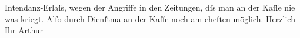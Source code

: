                Intendanz-Erlaſs, wegen der Angriffe in den Zeitungen, dſs man an der Kaſſe nie was
               kriegt. Alſo durch Dienſtma{\geminationn} an der Kaſſe noch am
               eheſten möglich.\pend
           \pstart Herzlich Ihr \spacefill\mbox{Arthur}\pend{}\endnumbering{}  \newcommand{\dateiname}{L01002}\newcommand{\titel}{Arthur Schnitzler an Richard Beer-Hofmann, [27. oder 28]. 11. 1899}\newcommand{\editorInnen}{Martin Anton Müller und Gerd-Hermann Susen}
